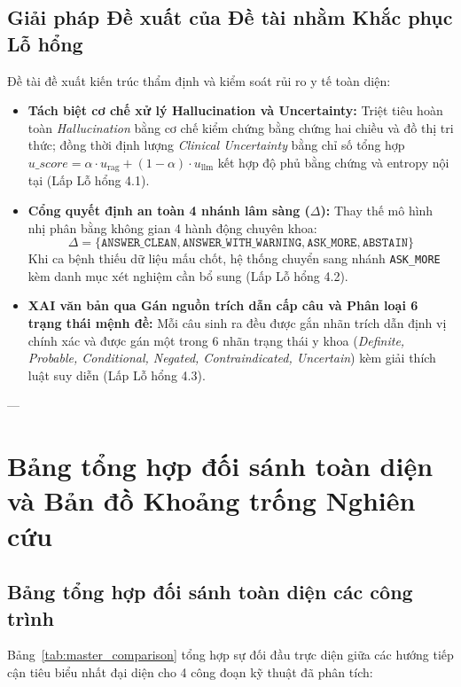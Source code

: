 \subsection{Giải pháp Đề xuất của Đề tài nhằm Khắc phục Lỗ hổng}
Đề tài đề xuất kiến trúc thẩm định và kiểm soát rủi ro y tế toàn diện:
\begin{itemize}
    \item \textbf{Tách biệt cơ chế xử lý Hallucination và Uncertainty:} Triệt tiêu hoàn toàn \emph{Hallucination} bằng cơ chế kiểm chứng bằng chứng hai chiều và đồ thị tri thức; đồng thời định lượng \emph{Clinical Uncertainty} bằng chỉ số tổng hợp $u\_score = \alpha \cdot u_{\mathrm{rag}} + (1-\alpha) \cdot u_{\mathrm{llm}}$ kết hợp độ phủ bằng chứng và entropy nội tại (Lấp Lỗ hổng 4.1).
    \item \textbf{Cổng quyết định an toàn 4 nhánh lâm sàng ($\Delta$):} Thay thế mô hình nhị phân bằng không gian 4 hành động chuyên khoa:
    \begin{equation}
        \Delta = \{\texttt{ANSWER\_CLEAN}, \texttt{ANSWER\_WITH\_}\allowbreak\texttt{WARNING}, \texttt{ASK\_MORE}, \texttt{ABSTAIN}\}
    \end{equation}
    Khi ca bệnh thiếu dữ liệu mấu chốt, hệ thống chuyển sang nhánh \texttt{ASK\_MORE} kèm danh mục xét nghiệm cần bổ sung (Lấp Lỗ hổng 4.2).
    \item \textbf{XAI văn bản qua Gán nguồn trích dẫn cấp câu và Phân loại 6 trạng thái mệnh đề:} Mỗi câu sinh ra đều được gắn nhãn trích dẫn định vị chính xác và được gán một trong 6 nhãn trạng thái y khoa (\emph{Definite, Probable, Conditional, Negated, Contraindicated, Uncertain}) kèm giải thích luật suy diễn (Lấp Lỗ hổng 4.3).
\end{itemize}

---

\clearpage
\section{Bảng tổng hợp đối sánh toàn diện và Bản đồ Khoảng trống Nghiên cứu}

\subsection{Bảng tổng hợp đối sánh toàn diện các công trình}
Bảng~\ref{tab:master_comparison} tổng hợp sự đối đầu trực diện giữa các hướng tiếp cận tiêu biểu nhất đại diện cho 4 công đoạn kỹ thuật đã phân tích:

